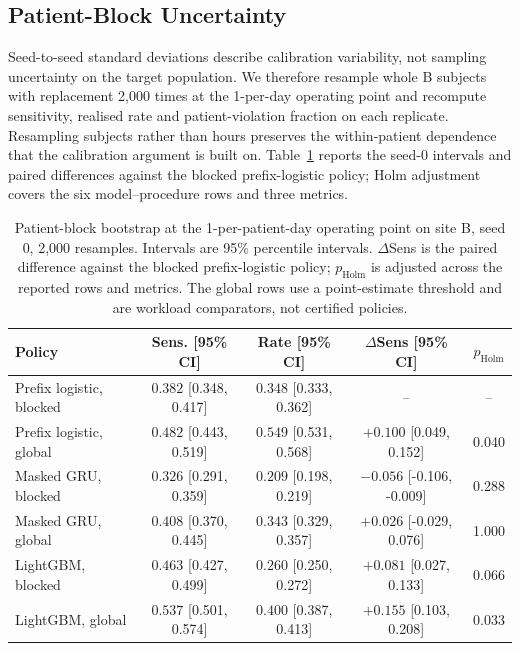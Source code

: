 \subsection{Patient-Block Uncertainty}
\label{sec:uncertainty}

Seed-to-seed standard deviations describe calibration variability, not sampling uncertainty on the target population. We therefore resample whole B subjects with replacement 2{,}000 times at the 1-per-day operating point and recompute sensitivity, realised rate and patient-violation fraction on each replicate. Resampling subjects rather than hours preserves the within-patient dependence that the calibration argument is built on. Table~\ref{tab:bootstrap} reports the seed-0 intervals and paired differences against the blocked prefix-logistic policy; Holm adjustment covers the six model--procedure rows and three metrics.

\begin{table}[H]
\centering
\caption{Patient-block bootstrap at the 1-per-patient-day operating point on site B, seed 0, 2{,}000 resamples. Intervals are 95\% percentile intervals. $\Delta$Sens is the paired difference against the blocked prefix-logistic policy; $p_{\mathrm{Holm}}$ is adjusted across the reported rows and metrics. The global rows use a point-estimate threshold and are workload comparators, not certified policies.}
\label{tab:bootstrap}
\scriptsize
\setlength{\tabcolsep}{3pt}
\begin{tabular}{lcccc}
\toprule
Policy & Sens. [95\% CI] & Rate [95\% CI] & $\Delta$Sens [95\% CI] & $p_{\mathrm{Holm}}$ \\
\midrule
Prefix logistic, blocked & $0.382$ [0.348, 0.417] & $0.348$ [0.333, 0.362] & -- & -- \\
Prefix logistic, global & $0.482$ [0.443, 0.519] & $0.549$ [0.531, 0.568] & $+0.100$ [0.049, 0.152] & 0.040 \\
Masked GRU, blocked & $0.326$ [0.291, 0.359] & $0.209$ [0.198, 0.219] & $-0.056$ [-0.106, -0.009] & 0.288 \\
Masked GRU, global & $0.408$ [0.370, 0.445] & $0.343$ [0.329, 0.357] & $+0.026$ [-0.029, 0.076] & 1.000 \\
LightGBM, blocked & $0.463$ [0.427, 0.499] & $0.260$ [0.250, 0.272] & $+0.081$ [0.027, 0.133] & 0.066 \\
LightGBM, global & $0.537$ [0.501, 0.574] & $0.400$ [0.387, 0.413] & $+0.155$ [0.103, 0.208] & 0.033 \\
\bottomrule
\end{tabular}
\end{table}

